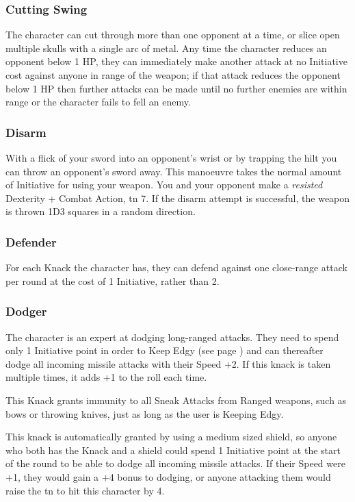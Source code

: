 \begin{multicols}{2}
\subsubsection{Cutting Swing}

The character can cut through more than one opponent at a time, or slice open multiple skulls with a single arc of metal.  Any time the character reduces an opponent below 1 HP, they can immediately make another attack at no Initiative cost against anyone in range of the weapon; if that attack reduces the opponent below 1 HP then further attacks can be made until no further enemies are within range or the character fails to fell an enemy.

\subsubsection{Disarm}

With a flick of your sword into an opponent's wrist or by trapping the hilt you can throw an opponent's sword away. This manoeuvre takes the normal amount of Initiative for using your weapon. You and your opponent make a \textit{resisted} Dexterity + Combat Action, \gls{tn} 7. If the disarm attempt is successful, the weapon is thrown 1D3 squares in a random direction.

\subsubsection{Defender}

For each Knack the character has, they can defend against one close-range attack per round at the cost of 1 Initiative, rather than 2.

\subsubsection{Dodger}

The character is an expert at dodging long-ranged attacks. They need to spend only 1 Initiative point in order to Keep Edgy (see page \pageref{edgy}) and can thereafter dodge all incoming missile attacks with their Speed +2. If this knack is taken multiple times, it adds +1 to the roll each time.

This Knack grants immunity to all Sneak Attacks from Ranged weapons, such as bows or throwing knives, just as long as the user is Keeping Edgy.

This knack is automatically granted by using a medium sized shield, so anyone who both has the Knack and a shield could spend 1 Initiative point at the start of the \gls{round} to be able to dodge all incoming missile attacks. If their Speed were +1, they would gain a +4 bonus to dodging, or anyone attacking them would raise the \gls{tn} to hit this character by 4.


\end{multicols}
